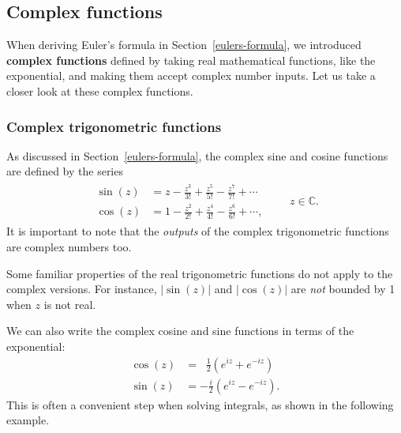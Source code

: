 \documentclass[10pt,a4paper]{article}
\begin{document}
\subsection{Complex functions}
\label{complex-functions}

When deriving Euler's formula in Section~\ref{eulers-formula}, we
introduced \textbf{complex functions} defined by taking real
mathematical functions, like the exponential, and making them accept
complex number inputs.  Let us take a closer look at these complex
functions.

\subsubsection{Complex trigonometric functions}
\label{complex-trigonometric-functions}

As discussed in Section~\ref{eulers-formula}, the complex sine and
cosine functions are defined by the series
\begin{align}
  \begin{aligned}
    \sin(z) &= z - \frac{z^3}{3!} + \frac{z^5}{5!} - \frac{z^7}{7!} + \cdots\\
    \cos(z) &= 1 - \frac{z^2}{2!} + \frac{z^4}{4!} - \frac{z^6}{6!} + \cdots,
  \end{aligned}
  \quad\quad z\in \mathbb{C}.
\end{align}
It is important to note that the \textit{outputs} of the complex
trigonometric functions are complex numbers too.

Some familiar properties of the real trigonometric functions do not
apply to the complex versions.  For instance, $|\sin(z)|$ and
$|\cos(z)|$ are \textit{not} bounded by 1 when $z$ is not real.

We can also write the complex cosine and sine functions in terms of
the exponential:
\begin{align}
  \cos(z) &= \;\;\frac{1}{2}\left(e^{iz} + e^{-iz}\right)
  \label{eq:cosz}\\
  \sin(z) &= -\frac{i}{2}\left(e^{iz} - e^{-iz}\right).
  \label{eq:sinz}
\end{align}
This is often a convenient step when solving integrals, as shown in
the following example.
\end{document}

